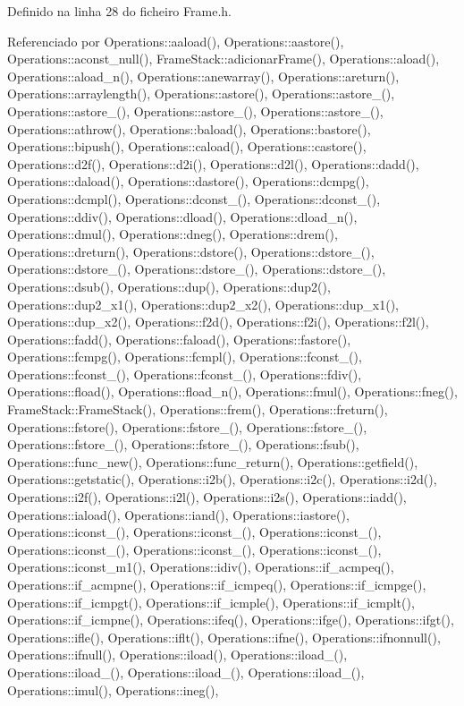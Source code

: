 Definido na linha 28 do ficheiro Frame.\+h.



Referenciado por Operations\+::aaload(), Operations\+::aastore(), Operations\+::aconst\+\_\+null(), Frame\+Stack\+::adicionar\+Frame(), Operations\+::aload(), Operations\+::aload\+\_\+n(), Operations\+::anewarray(), Operations\+::areturn(), Operations\+::arraylength(), Operations\+::astore(), Operations\+::astore\+\_(), Operations\+::astore\+\_(), Operations\+::astore\+\_(), Operations\+::astore\+\_(), Operations\+::athrow(), Operations\+::baload(), Operations\+::bastore(), Operations\+::bipush(), Operations\+::caload(), Operations\+::castore(), Operations\+::d2f(), Operations\+::d2i(), Operations\+::d2l(), Operations\+::dadd(), Operations\+::daload(), Operations\+::dastore(), Operations\+::dcmpg(), Operations\+::dcmpl(), Operations\+::dconst\+\_(), Operations\+::dconst\+\_(), Operations\+::ddiv(), Operations\+::dload(), Operations\+::dload\+\_\+n(), Operations\+::dmul(), Operations\+::dneg(), Operations\+::drem(), Operations\+::dreturn(), Operations\+::dstore(), Operations\+::dstore\+\_(), Operations\+::dstore\+\_(), Operations\+::dstore\+\_(), Operations\+::dstore\+\_(), Operations\+::dsub(), Operations\+::dup(), Operations\+::dup2(), Operations\+::dup2\+\_\+x1(), Operations\+::dup2\+\_\+x2(), Operations\+::dup\+\_\+x1(), Operations\+::dup\+\_\+x2(), Operations\+::f2d(), Operations\+::f2i(), Operations\+::f2l(), Operations\+::fadd(), Operations\+::faload(), Operations\+::fastore(), Operations\+::fcmpg(), Operations\+::fcmpl(), Operations\+::fconst\+\_(), Operations\+::fconst\+\_(), Operations\+::fconst\+\_(), Operations\+::fdiv(), Operations\+::fload(), Operations\+::fload\+\_\+n(), Operations\+::fmul(), Operations\+::fneg(), Frame\+Stack\+::\+Frame\+Stack(), Operations\+::frem(), Operations\+::freturn(), Operations\+::fstore(), Operations\+::fstore\+\_(), Operations\+::fstore\+\_(), Operations\+::fstore\+\_(), Operations\+::fstore\+\_(), Operations\+::fsub(), Operations\+::func\+\_\+new(), Operations\+::func\+\_\+return(), Operations\+::getfield(), Operations\+::getstatic(), Operations\+::i2b(), Operations\+::i2c(), Operations\+::i2d(), Operations\+::i2f(), Operations\+::i2l(), Operations\+::i2s(), Operations\+::iadd(), Operations\+::iaload(), Operations\+::iand(), Operations\+::iastore(), Operations\+::iconst\+\_(), Operations\+::iconst\+\_(), Operations\+::iconst\+\_(), Operations\+::iconst\+\_(), Operations\+::iconst\+\_(), Operations\+::iconst\+\_(), Operations\+::iconst\+\_\+m1(), Operations\+::idiv(), Operations\+::if\+\_\+acmpeq(), Operations\+::if\+\_\+acmpne(), Operations\+::if\+\_\+icmpeq(), Operations\+::if\+\_\+icmpge(), Operations\+::if\+\_\+icmpgt(), Operations\+::if\+\_\+icmple(), Operations\+::if\+\_\+icmplt(), Operations\+::if\+\_\+icmpne(), Operations\+::ifeq(), Operations\+::ifge(), Operations\+::ifgt(), Operations\+::ifle(), Operations\+::iflt(), Operations\+::ifne(), Operations\+::ifnonnull(), Operations\+::ifnull(), Operations\+::iload(), Operations\+::iload\+\_(), Operations\+::iload\+\_(), Operations\+::iload\+\_(), Operations\+::iload\+\_(), Operations\+::imul(), Operations\+::ineg(), 